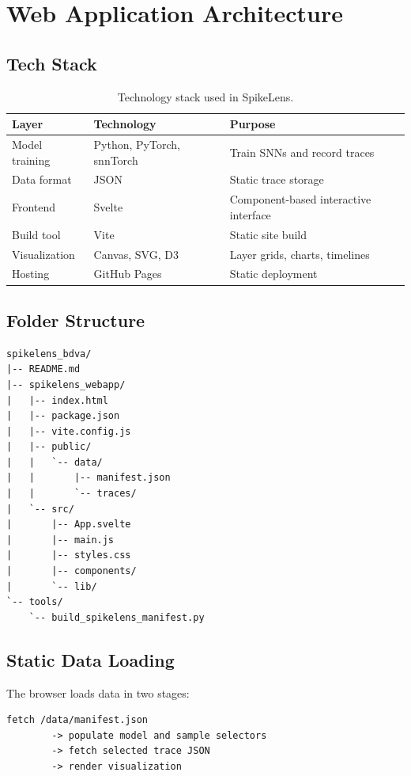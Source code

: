 \documentclass[11pt,a4paper]{article}
\newcommand{\projecttitle}{SpikeLens}
\begin{document}
\section{Web Application Architecture}

\subsection{Tech Stack}

\begin{table}[H]
\centering
\caption{Technology stack used in \projecttitle{}.}
\begin{tabularx}{\textwidth}{lll}
\toprule
Layer & Technology & Purpose \\
\midrule
Model training & Python, PyTorch, snnTorch & Train SNNs and record traces \\
Data format & JSON & Static trace storage \\
Frontend & Svelte & Component-based interactive interface \\
Build tool & Vite & Static site build \\
Visualization & Canvas, SVG, D3 & Layer grids, charts, timelines \\
Hosting & GitHub Pages & Static deployment \\
\bottomrule
\end{tabularx}
\end{table}

\subsection{Folder Structure}

\begin{lstlisting}
spikelens_bdva/
|-- README.md
|-- spikelens_webapp/
|   |-- index.html
|   |-- package.json
|   |-- vite.config.js
|   |-- public/
|   |   `-- data/
|   |       |-- manifest.json
|   |       `-- traces/
|   `-- src/
|       |-- App.svelte
|       |-- main.js
|       |-- styles.css
|       |-- components/
|       `-- lib/
`-- tools/
    `-- build_spikelens_manifest.py
\end{lstlisting}

\subsection{Static Data Loading}

The browser loads data in two stages:

\begin{lstlisting}
fetch /data/manifest.json
        -> populate model and sample selectors
        -> fetch selected trace JSON
        -> render visualization
\end{lstlisting}
\end{document}
